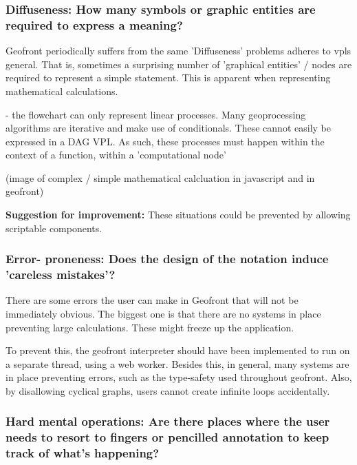 \subsubsection*{Diffuseness: How many symbols or graphic entities are required to express a meaning?}

Geofront periodically suffers from the same 'Diffuseness' problems \cite[]{green_usability_1996} adheres to vpls general. 
That is, sometimes a surprising number of 'graphical entities' / nodes are required to represent a simple statement.  
This is apparent when representing mathematical calculations. 

\begin{note}
  - the flowchart can only represent linear processes. Many geoprocessing algorithms are iterative and make use of conditionals. These cannot easily be expressed in a DAG VPL. As such, these processes must happen within the context of a function, within a 'computational node'  
\end{note}


(image of complex / simple mathematical calcluation in javascript and in geofront)

\textbf{Suggestion for improvement:} These situations could be prevented by allowing scriptable components. 

\subsubsection*{Error- proneness: Does the design of the notation induce 'careless mistakes'?}

There are some errors the user can make  in Geofront that will not be immediately obvious. 
The biggest one is that there are no systems in place preventing large calculations. 
These might freeze up the application. 

To prevent this, the geofront interpreter should have been implemented to run on a separate thread, using a web worker. 
Besides this, in general, many systems are in place preventing errors, such as the type-safety used throughout geofront.
Also, by disallowing cyclical graphs, users cannot create infinite loops accidentally.

\subsubsection*{Hard mental operations: Are there places where the user needs to resort to fingers or pencilled annotation to keep track of what's happening?}

